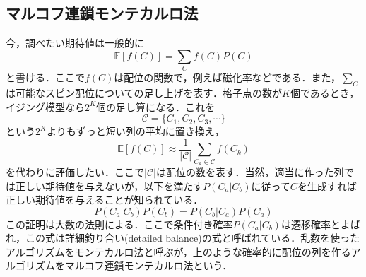 \documentclass[a4paper,11pt]{jsreport}
\begin{document}
\subsection{マルコフ連鎖モンテカルロ法}
今，調べたい期待値は一般的に
\begin{equation}
  \mathbb{E}[f(C)] = \sum_{C} f(C)P(C)
\end{equation}
と書ける．ここで$f(C)$は配位の関数で，例えば磁化率などである．また，$\sum_{C}$は可能なスピン配位についての足し上げを表す．格子点の数が$K$個であるとき，イジング模型なら$2^K$個の足し算になる．これを
\begin{equation}
  \mathcal{C} = \{ C_1, C_2, C_3, \cdots \}
\end{equation}
という$2^K$よりもずっと短い列の平均に置き換え，
\begin{equation}
  \mathbb{E}[f(C)] \approx \frac{1}{|\mathcal{C|}}\sum_{C_k \in \mathcal{C}}f(C_k)
\end{equation}
を代わりに評価したい．ここで$|\mathcal{C}|$は配位の数を表す．当然，適当に作った列では正しい期待値を与えないが，以下を満たす$P(C_a|C_b)$に従って$C$を生成すれば正しい期待値を与えることが知られている．
\begin{equation}
  P(C_a|C_b)P(C_b) = P(C_b|C_a)P(C_a)
\end{equation}
この証明は大数の法則による．ここで条件付き確率$P(C_a|C_b)$は遷移確率とよばれ，この式は詳細釣り合い(detailed balance)の式と呼ばれている．乱数を使ったアルゴリズムをモンテカルロ法と呼ぶが，上のような確率的に配位の列を作るアルゴリズムをマルコフ連鎖モンテカルロ法という．\par
\end{document}
